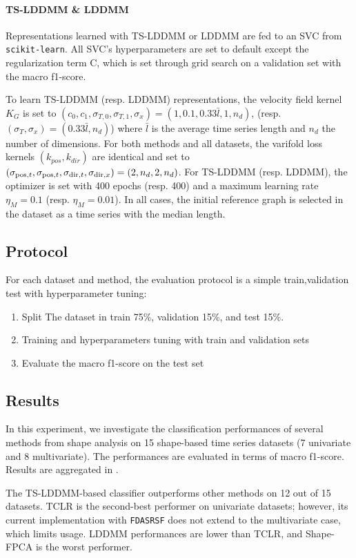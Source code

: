 \paragraph{TS-LDDMM \& LDDMM}
Representations learned with TS-LDDMM or LDDMM are fed to an SVC from \texttt{scikit-learn}. All SVC's hyperparameters are set to default except the regularization term C, which is set through grid search on a validation set with the macro f1-score. 

To learn TS-LDDMM (resp. LDDMM) representations, the velocity field kernel $K_G$ is set to $ (c_0,c_1,\sigma_{T,0},\sigma_{T,1},\sigma_x) = (1,0.1,0.33\bar{l},1,n_d)$, (resp. $ (\sigma_{T},\sigma_x) = (0.33\bar{l},n_d)$) where $\bar{l}$ is the average time series length and $n_d$ the number of dimensions. For both methods and all datasets, the varifold loss kernels $(k_{pos},k_{dir})$ are identical and set to $(\sigma_{\mathrm{pos},t}, \sigma_{\mathrm{pos},t}, \sigma_{\mathrm{dir},t}, \sigma_{\mathrm{dir},x}) = (2,n_d,2,n_d)$. For TS-LDDMM (resp. LDDMM), the optimizer is set with 400 epochs (resp. 400) and a maximum learning rate $\eta_M = 0.1$ (resp. $\eta_M = 0.01$). In all cases, the initial reference graph is selected in the dataset as a time series with the median length.


\subsection{Protocol}
For each dataset and method, the evaluation protocol is a simple train,validation test with hyperparameter tuning:
\begin{enumerate}
  \item Split The dataset in train 75\%, validation 15\%, and test 15\%.
  \item Training and hyperparameters tuning with train and validation sets
  \item Evaluate the macro f1-score on the test set 
\end{enumerate}


\subsection{Results}
In this experiment, we investigate the classification performances of several methods from shape analysis on 15 shape-based time series datasets (7 univariate and 8 multivariate). The performances are evaluated in terms of macro f1-score. Results are aggregated in . 

The TS-LDDMM-based classifier outperforms other methods on 12 out of 15 datasets. TCLR is the second-best performer on univariate datasets; however, its current implementation with \texttt{FDASRSF} does not extend to the multivariate case, which limits usage. LDDMM performances are lower than TCLR, and Shape-FPCA is the worst performer. 

